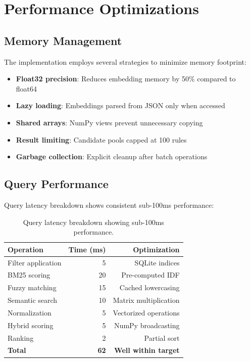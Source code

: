 \section{Performance Optimizations}

\subsection{Memory Management}

The implementation employs several strategies to minimize memory footprint:

\begin{itemize}[leftmargin=*,itemsep=3pt,topsep=3pt]
  \item \textbf{Float32 precision}: Reduces embedding memory by 50\% compared to float64
  \item \textbf{Lazy loading}: Embeddings parsed from JSON only when accessed
  \item \textbf{Shared arrays}: NumPy views prevent unnecessary copying
  \item \textbf{Result limiting}: Candidate pools capped at 100 rules
  \item \textbf{Garbage collection}: Explicit cleanup after batch operations
\end{itemize}

\subsection{Query Performance}

Query latency breakdown shows consistent sub-100ms performance:

\begin{table}[!htbp]
\centering
\begin{tabular}{lrr}
\toprule
\textbf{Operation} & \textbf{Time (ms)} & \textbf{Optimization} \\
\midrule
Filter application & 5 & SQLite indices \\
BM25 scoring & 20 & Pre-computed IDF \\
Fuzzy matching & 15 & Cached lowercasing \\
Semantic search & 10 & Matrix multiplication \\
Normalization & 5 & Vectorized operations \\
Hybrid scoring & 5 & NumPy broadcasting \\
Ranking & 2 & Partial sort \\
\midrule
\textbf{Total} & \textbf{62} & \textbf{Well within target} \\
\bottomrule
\end{tabular}
\caption{Query latency breakdown showing sub-100ms performance.}
\label{tab:query-performance}
\end{table}

